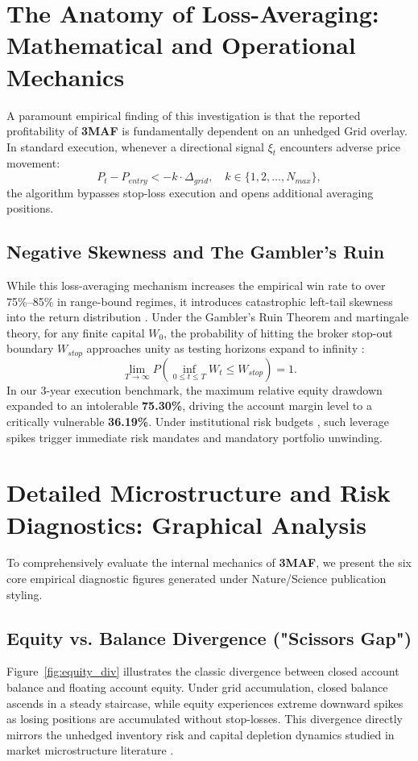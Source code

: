 \documentclass[11pt,a4paper]{article}
\begin{document}
\section{The Anatomy of Loss-Averaging: Mathematical and Operational Mechanics}
A paramount empirical finding of this investigation is that the reported profitability of \textbf{3MAF} is fundamentally dependent on an unhedged Grid overlay. In standard execution, whenever a directional signal $\xi_t$ encounters adverse price movement:
\begin{equation}
P_t - P_{entry} < -k \cdot \Delta_{grid}, \quad k \in \{1, 2, \dots, N_{max}\},
\end{equation}
the algorithm bypasses stop-loss execution and opens additional averaging positions. 

\subsection{Negative Skewness and The Gambler's Ruin}
While this loss-averaging mechanism increases the empirical win rate to over 75\%--85\% in range-bound regimes, it introduces catastrophic left-tail skewness into the return distribution \cite{bouchaud2003theory, cont2001empirical}. Under the Gambler's Ruin Theorem and martingale theory, for any finite capital $W_0$, the probability of hitting the broker stop-out boundary $W_{stop}$ approaches unity as testing horizons expand to infinity \cite{bouchaud2009markets}:
\begin{equation}
\lim_{T \to \infty} P\left(\inf_{0 \le t \le T} W_t \le W_{stop}\right) = 1.
\end{equation}
In our 3-year execution benchmark, the maximum relative equity drawdown expanded to an intolerable \textbf{75.30\%}, driving the account margin level to a critically vulnerable \textbf{36.19\%}. Under institutional risk budgets \cite{rockafellar2000optimization, shleifer1997limits}, such leverage spikes trigger immediate risk mandates and mandatory portfolio unwinding.


\section{Detailed Microstructure and Risk Diagnostics: Graphical Analysis}
To comprehensively evaluate the internal mechanics of \textbf{3MAF}, we present the six core empirical diagnostic figures generated under Nature/Science publication styling.

\subsection{Equity vs. Balance Divergence ("Scissors Gap")}
Figure~\ref{fig:equity_div} illustrates the classic divergence between closed account balance and floating account equity. Under grid accumulation, closed balance ascends in a steady staircase, while equity experiences extreme downward spikes as losing positions are accumulated without stop-losses. This divergence directly mirrors the unhedged inventory risk and capital depletion dynamics studied in market microstructure literature \cite{shleifer1997limits, bouchaud2009markets}.
\end{document}
